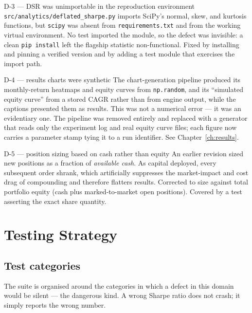 \documentclass[12pt,a4paper,oneside]{report}
\begin{document}
\begin{negativebox}{D-3 --- DSR was unimportable in the reproduction environment}
\texttt{src/analytics/deflated\_sharpe.py} imports SciPy's normal, skew, and
kurtosis functions, but \texttt{scipy} was absent from \texttt{requirements.txt}
and from the working virtual environment. No test imported the module, so the
defect was invisible: a clean \texttt{pip install} left the flagship statistic
non-functional. Fixed by installing and pinning a verified version and by adding
a test module that exercises the import path.
\end{negativebox}

\begin{negativebox}{D-4 --- results charts were synthetic}
The chart-generation pipeline produced its monthly-return heatmaps and equity
curves from \texttt{np.random}, and its ``simulated equity curve'' from a stored
CAGR rather than from engine output, while the captions presented them as
results. This was not a numerical error --- it was an evidentiary one. The
pipeline was removed entirely and replaced with a generator that reads only the
experiment log and real equity curve files; each figure now carries a parameter
stamp tying it to a run identifier. See Chapter~\ref{ch:results}.
\end{negativebox}

\begin{negativebox}{D-5 --- position sizing based on cash rather than equity}
An earlier revision sized new positions as a fraction of \emph{available cash}.
As capital deployed, every subsequent order shrank, which artificially suppresses
the market-impact and cost drag of compounding and therefore flatters results.
Corrected to size against total portfolio equity (cash plus marked-to-market
open positions). Covered by a test asserting the exact share quantity.
\end{negativebox}

\section{Testing Strategy}\label{sec:testing}

\subsection{Test categories}

The suite is organised around the categories in which a defect in this domain
would be silent --- the dangerous kind. A wrong Sharpe ratio does not crash; it
simply reports the wrong number.
\end{document}
